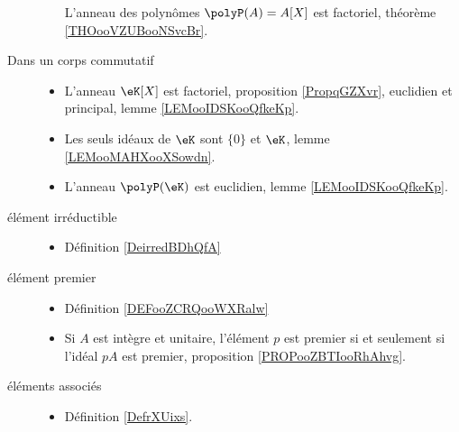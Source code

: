 \begin{description}
\begin{itemize}
		      L'anneau des polynômes \( \polyP(A)=A[X]\) est factoriel, théorème \ref{THOooVZUBooNSvcBr}.
	\end{itemize}
	\item[Dans un corps commutatif]\hspace{1cm}
	\begin{itemize}
		\item
		      L'anneau \( \eK[X]\) est factoriel, proposition \ref{PropqGZXvr}, euclidien et principal, lemme \ref{LEMooIDSKooQfkeKp}.
		\item
		      Les seuls idéaux de \( \eK\) sont \( \{ 0 \}\) et \( \eK\), lemme \ref{LEMooMAHXooXSowdn}.
		\item
		      L'anneau \( \polyP(\eK)\) est euclidien, lemme \ref{LEMooIDSKooQfkeKp}.
	\end{itemize}
\end{description}

\begin{description}
	\item[élément irréductible]\hspace{1cm}
	\begin{itemize}
		\item Définition \ref{DeirredBDhQfA}
	\end{itemize}
	\item[élément premier]\hspace{1cm}
	\begin{itemize}
		\item Définition \ref{DEFooZCRQooWXRalw}
		\item
		      Si \( A\) est intègre et unitaire, l'élément \( p\) est premier si et seulement si l'idéal \( pA\) est premier, proposition \ref{PROPooZBTIooRhAhvg}.
	\end{itemize}
	\item[éléments associés]\hspace{1cm}
	\begin{itemize}
		\item Définition \ref{DefrXUixs}.
	\end{itemize}
\end{description}

